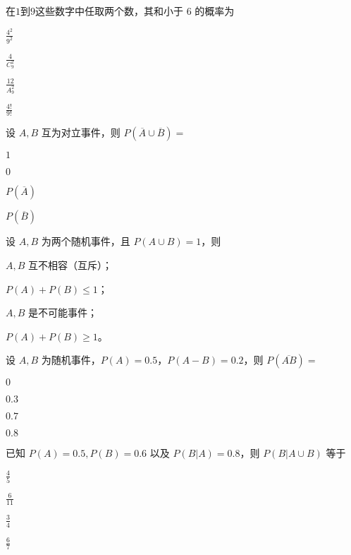 \documentclass{exam-zh}
\begin{document}
\begin{question}
  在$1$到$9$这些数字中任取两个数，其和小于 $6$ 的概率为 \paren[B]
  \begin{choices}
    \item $\frac{4^2}{9^2}$  
    \item $\frac{4}{C_9^2}$  
    \item $\frac{12}{A_{9}^{2}}$  
    \item $\frac{4!}{9!}$  
  \end{choices}
\end{question}

\begin{question}
  设 $A, B$ 互为对立事件，则 $P(\overline{A} \cup \overline{B}) =$ \paren[A]
  \begin{choices}
    \item $1$  
    \item $0$  
    \item $P(\overline{A})$  
    \item $P(\overline{B})$  
  \end{choices}
\end{question}

\begin{question}
  设 $A, B$ 为两个随机事件，且 $P(A \cup B) = 1$，则 \paren[D]
  \begin{choices}
    \item $A, B$ 互不相容（互斥）；
    \item $P(A) + P(B) \leq 1$；
    \item $A, B$ 是不可能事件；
    \item $P(A) + P(B) \geq 1$。
  \end{choices}
\end{question}

\begin{question}
  设 $A, B$ 为随机事件，$P(A) = 0.5$，$P(A - B) = 0.2$，则  
  $P(\overline{AB}) = $ \paren[C]
  \begin{choices}
    \item $0$  
    \item $0.3$  
    \item $0.7$  
    \item $0.8$  
  \end{choices}
\end{question}

\begin{question}
  已知 $P(A) = 0.5, P(B) = 0.6$ 以及 $P(B|A) = 0.8$，则  
  $P(B|A \cup B)$ 等于 \paren[D]
  \begin{choices}
    \item $\frac{4}{5}$  
    \item $\frac{6}{11}$  
    \item $\frac{3}{4}$  
    \item $\frac{6}{7}$  
  \end{choices}
\end{question}
\end{document}
